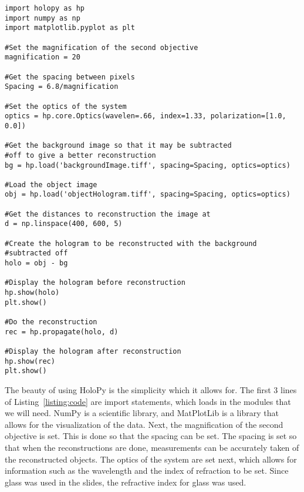 
\begin{Code}[scale=0.75,htbp!]
    \centering
\begin{lstlisting}[caption=Code for a general reconstruction, label=listing:code]
import holopy as hp
import numpy as np
import matplotlib.pyplot as plt

#Set the magnification of the second objective
magnification = 20

#Get the spacing between pixels
Spacing = 6.8/magnification

#Set the optics of the system
optics = hp.core.Optics(wavelen=.66, index=1.33, polarization=[1.0, 0.0])

#Get the background image so that it may be subtracted 
#off to give a better reconstruction
bg = hp.load('backgroundImage.tiff', spacing=Spacing, optics=optics)

#Load the object image
obj = hp.load('objectHologram.tiff', spacing=Spacing, optics=optics)

#Get the distances to reconstruction the image at
d = np.linspace(400, 600, 5)

#Create the hologram to be reconstructed with the background 
#subtracted off
holo = obj - bg

#Display the hologram before reconstruction
hp.show(holo)
plt.show()

#Do the reconstruction
rec = hp.propagate(holo, d)

#Display the hologram after reconstruction
hp.show(rec)
plt.show()

\end{lstlisting}
\end{Code}

The beauty of using HoloPy is the simplicity which it allows for. The first 3
lines of Listing~\ref{listing:code} are import statements, which loads in the
modules that we will need. NumPy is a scientific library, and MatPlotLib is a
library that allows for the visualization of the data. Next, the magnification
of the second objective is set. This is done so that the spacing can be set.
The spacing is set so that when the reconstructions are done, measurements can
be accurately taken of the reconstructed objects. The optics of the system are
set next, which allows for information such as the wavelength and the index of
refraction to be set. Since glass was used in the slides, the refractive index
for glass was used.

